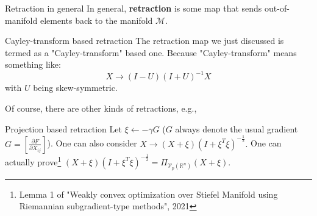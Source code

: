 \documentclass[aspectratio=43, 10pt]{beamer}
\begin{document}
    \begin{frame}[t]{Retraction in general}
        \vspace{-0.3cm}
        \small 
        In general, \textbf{retraction} is some map that sends out-of-manifold elements back to the manifold $\mathcal{M}$. 

        \begin{block}{Cayley-transform based retraction}
            The retraction map we just discussed is termed as a "Cayley-transform" based one. Because "Cayley-transform" means something like: 
            $$X \to (I-U)(I+U)^{-1}X$$
            with $U$ being skew-symmetric. 
        \end{block}
        
        \pause 
        
        Of course, there are other kinds of retractions, e.g., 
        \begin{block}{Projection based retraction}
            Let $\xi \gets -\gamma G$ ($G$ always denote the usual gradient $G=[\frac{\partial F}{\partial X_{ij}}]$). One can also consider $X \to (X+\xi)(I+ \xi^T \xi)^{-\frac{1}{2}}.$ 
            One can actually prove\footnote{Lemma 1 of "Weakly convex optimization over Stiefel Manifold using Riemannian subgradient-type methods", 2021} $(X+\xi)(I+ \xi^T \xi)^{-\frac{1}{2}} = \Pi_{\mathcal{V}_p(\mathbb{R}^n)} (X + \xi).$
        \end{block}
    \end{frame}
\end{document}
